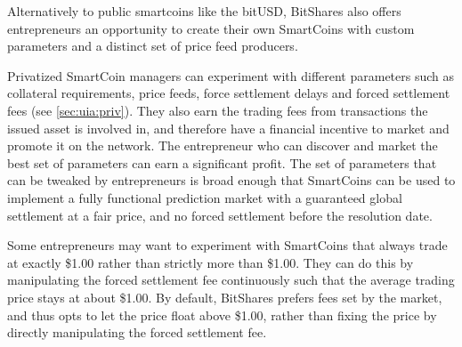 Alternatively to public smartcoins like the bitUSD, BitShares also offers
entrepreneurs an opportunity to create their own SmartCoins with custom
parameters and a distinct set of price feed producers.

Privatized SmartCoin managers can experiment with different parameters such as
collateral requirements, price feeds, force settlement delays and forced
settlement fees (see \cref{sec:uia:priv}). They also earn the trading fees from
transactions the issued asset is involved in, and therefore have a financial
incentive to market and promote it on the network. The entrepreneur who can
discover and market the best set of parameters can earn a significant profit.
The set of parameters that can be tweaked by entrepreneurs is broad enough that
SmartCoins can be used to implement a fully functional prediction market with a
guaranteed global settlement at a fair price, and no forced settlement before
the resolution date.

Some entrepreneurs may want to experiment with SmartCoins that always trade at
exactly \$1.00 rather than strictly more than \$1.00. They can do this by
manipulating the forced settlement fee continuously such that the average
trading price stays at about \$1.00. By default, BitShares prefers fees set by
the market, and thus opts to let the price float above \$1.00, rather than
fixing the price by directly manipulating the forced settlement fee.

